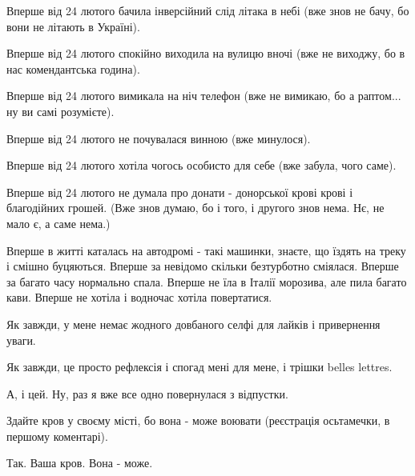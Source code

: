 Вперше від 24 лютого бачила інверсійний слід літака в небі (вже знов не бачу,
бо вони не літають в Україні). 

Вперше від 24 лютого спокійно виходила на вулицю вночі (вже не виходжу, бо в
нас комендантська година). 

Вперше від 24 лютого вимикала на ніч телефон (вже не вимикаю, бо а раптом... ну
ви самі розумієте). 

Вперше від 24 лютого не почувалася винною (вже минулося).

Вперше від 24 лютого хотіла чогось особисто для себе (вже забула, чого саме).    

Вперше від 24 лютого не думала про донати - донорської крові крові і
благодійних грошей. (Вже знов думаю, бо і того, і другого знов нема. Нє, не
мало є, а саме нема.)

Вперше в житті каталась на автодромі - такі машинки, знаєте, що їздять на треку
і смішно буцяються. Вперше за невідомо скільки безтурботно сміялася. Вперше за
багато часу нормально спала. Вперше не їла в Італії морозива, але пила багато
кави. Вперше не хотіла і водночас хотіла повертатися. 

Як завжди, у мене немає жодного довбаного селфі для лайків і привернення уваги.

Як завжди, це просто рефлексія і спогад мені для мене, і трішки  belles
lettres.

А, і цей. Ну, раз я вже все одно повернулася з відпустки. 

Здайте кров у своєму місті, бо вона - може воювати (реєстрація осьтамечки, в
першому коментарі). 

Так. Ваша кров. Вона - може.

